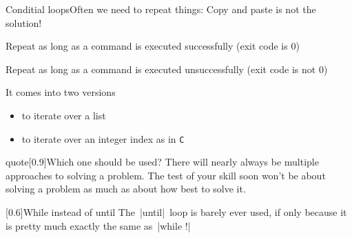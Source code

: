 
\begin{frame}{Conditial loops}{Often we need to repeat things: Copy and paste is not the solution!}
    \vspace{-3mm}
    \begin{description}
        \item[\texttt{while}] Repeat as long as a command is executed successfully (exit code is 0)
        \item[\texttt{until}] Repeat as long as a command is executed unsuccessfully (exit code is not 0)
        \item[\texttt{for}] It comes into two versions
                            \begin{itemize}
                                \item to iterate over a list
                                \item to iterate over an integer index as in \texttt{C}
                            \end{itemize}
    \end{description}
    \begin{varblock}{quote}[0.9\textwidth]{Which one should be used?}
        There will nearly always be multiple approaches to solving a problem.
        The test of your skill soon won't be about solving a problem as much as about how best to solve it.
    \end{varblock}
    \begin{varblock}{}[0.6\textwidth]{While instead of until}
        The \,\bash|until|\, loop is barely ever used, if only because it is pretty much exactly the same as \,\bash|while !|
    \end{varblock}
\end{frame}
